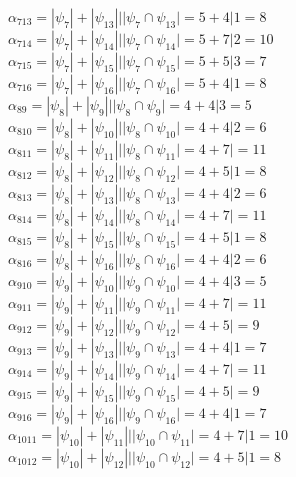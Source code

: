 \documentclass[12pt,a4paper]{report}
\begin{document}
$\alpha_{713} = |\psi_{7}| + |\psi_{13}| | |\psi_{7} \cap \psi_{13}| = 5 + 4 | 1 = 8$ \\
$\alpha_{714} = |\psi_{7}| + |\psi_{14}| | |\psi_{7} \cap \psi_{14}| = 5 + 7 | 2 = 10$ \\
$\alpha_{715} = |\psi_{7}| + |\psi_{15}| | |\psi_{7} \cap \psi_{15}| = 5 + 5 | 3 = 7$ \\
$\alpha_{716} = |\psi_{7}| + |\psi_{16}| | |\psi_{7} \cap \psi_{16}| = 5 + 4 | 1 = 8$ \\
$\alpha_{89} = |\psi_{8}| + |\psi_{9}| | |\psi_{8} \cap \psi_{9}| = 4 + 4 | 3 = 5$ \\
$\alpha_{810} = |\psi_{8}| + |\psi_{10}| | |\psi_{8} \cap \psi_{10}| = 4 + 4 | 2 = 6$ \\
$\alpha_{811} = |\psi_{8}| + |\psi_{11}| | |\psi_{8} \cap \psi_{11}| = 4 + 7 |   = 11$ \\
$\alpha_{812} = |\psi_{8}| + |\psi_{12}| | |\psi_{8} \cap \psi_{12}| = 4 + 5 | 1 = 8$ \\
$\alpha_{813} = |\psi_{8}| + |\psi_{13}| | |\psi_{8} \cap \psi_{13}| = 4 + 4 | 2 = 6$ \\
$\alpha_{814} = |\psi_{8}| + |\psi_{14}| | |\psi_{8} \cap \psi_{14}| = 4 + 7 |   = 11$ \\
$\alpha_{815} = |\psi_{8}| + |\psi_{15}| | |\psi_{8} \cap \psi_{15}| = 4 + 5 | 1 = 8$ \\
$\alpha_{816} = |\psi_{8}| + |\psi_{16}| | |\psi_{8} \cap \psi_{16}| = 4 + 4 | 2 = 6$ \\
$\alpha_{910} = |\psi_{9}| + |\psi_{10}| | |\psi_{9} \cap \psi_{10}| = 4 + 4 | 3 = 5$ \\
$\alpha_{911} = |\psi_{9}| + |\psi_{11}| | |\psi_{9} \cap \psi_{11}| = 4 + 7 |   = 11$ \\
$\alpha_{912} = |\psi_{9}| + |\psi_{12}| | |\psi_{9} \cap \psi_{12}| = 4 + 5 |   = 9$ \\
$\alpha_{913} = |\psi_{9}| + |\psi_{13}| | |\psi_{9} \cap \psi_{13}| = 4 + 4 | 1 = 7$ \\
$\alpha_{914} = |\psi_{9}| + |\psi_{14}| | |\psi_{9} \cap \psi_{14}| = 4 + 7 |   = 11$ \\
$\alpha_{915} = |\psi_{9}| + |\psi_{15}| | |\psi_{9} \cap \psi_{15}| = 4 + 5 |   = 9$ \\
$\alpha_{916} = |\psi_{9}| + |\psi_{16}| | |\psi_{9} \cap \psi_{16}| = 4 + 4 | 1 = 7$ \\
$\alpha_{1011} = |\psi_{10}| + |\psi_{11}| | |\psi_{10} \cap \psi_{11}| = 4 + 7 | 1 = 10$ \\
$\alpha_{1012} = |\psi_{10}| + |\psi_{12}| | |\psi_{10} \cap \psi_{12}| = 4 + 5 | 1 = 8$ \\
\end{document}
